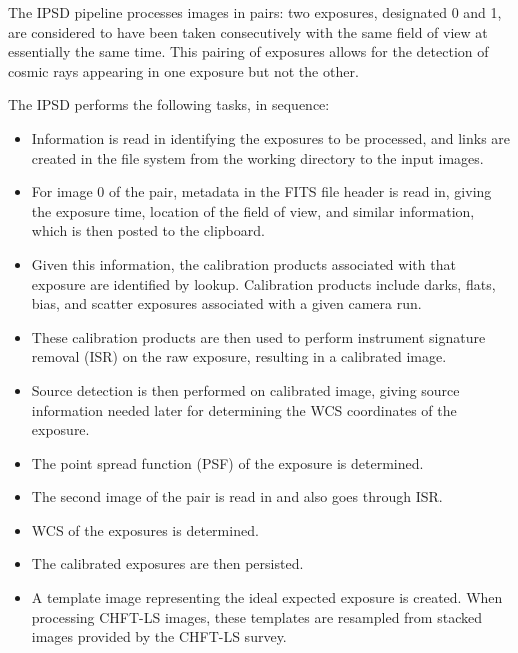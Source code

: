 The IPSD pipeline processes images in pairs: two exposures, designated
0 and 1, are considered to have been taken consecutively with the same
field of view at essentially the same time. This pairing of exposures
allows for the detection of cosmic rays appearing in one exposure but
not the other.

The IPSD performs the following tasks, in sequence:

\begin{itemize}

\item Information is read in identifying the exposures to be processed, and 
links are created in the file system from the working directory to the input
images.

\item For image 0 of the pair, metadata in the FITS file header is read in, 
giving the exposure time, location of the field of view, and similar information, 
which is then posted to the clipboard.

\item Given this information, the calibration products associated with that
exposure are identified by lookup. Calibration products include darks,
flats, bias, and scatter exposures associated with a given camera run.

\item These calibration products are then used to perform instrument
signature removal (ISR) on the raw exposure, resulting in a calibrated image.

\item Source detection is then performed on calibrated image, giving source
information needed later for determining the WCS coordinates of the
exposure.

\item The point spread function (PSF) of the exposure is determined.

\item The second image of the pair is read in and also goes through ISR.

\item WCS of the exposures is determined.

\item The calibrated exposures are then persisted.

\item A template image representing the ideal expected exposure is
created. When processing CHFT-LS images, these templates are 
resampled from stacked images provided by the CHFT-LS survey.


\end{itemize}
